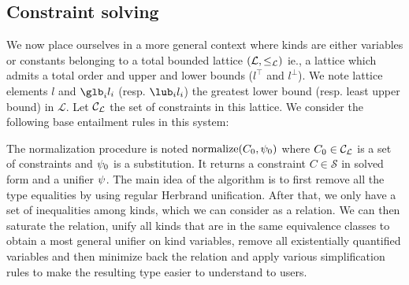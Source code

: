\subsection{Constraint solving}
\label{infer:solving}


We now place ourselves in a more general context where kinds are either variables
or constants belonging to a total bounded lattice $(\mathcal L, \leq_\mathcal L)$ ie.,
a lattice which admits a total order and upper and lower bounds ($l^\top$ and $l^\bot$).
We note lattice elements $l$ and $\glb_i l_i$ (resp. $\lub_i l_i$)
the greatest lower bound (resp. least upper bound) in $\mathcal L$.
%
Let ${\mathcal C_{\mathcal L}}$ the set of constraints in this lattice. We consider the
following base entailment rules in this system:
\begin{center}
\end{center}



The normalization procedure is noted $\operatorname{normalize}(C_0,\mathrm{\psi}_0)$ where
$C_0\in {\mathcal C_{\mathcal L}}$ is a set of constraints and $\mathrm{\psi}_0$ is a substitution.
It returns a constraint $C \in \mathcal S$ in
solved form and a unifier $\mathrm{\psi}$.
The main idea of the algorithm is to first remove all the type equalities
by using regular Herbrand unification. After that, we only have
a set of inequalities among kinds, which we can consider as a relation.
We can then saturate the relation,
unify all kinds that are in the same equivalence classes to obtain
a most general unifier on kind variables,
remove all existentially quantified variables and
then minimize back the relation and apply various
simplification rules to make the resulting type easier to understand to users.

